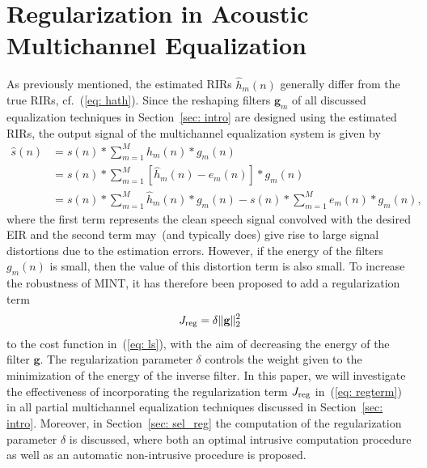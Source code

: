 \documentclass[draftcls,onecolumn,11pt]{IEEEtran}
\begin{document}
\section{Regularization in Acoustic Multichannel Equalization}
\label{sec: reg}
As previously mentioned, the estimated RIRs $\hat{h}_m(n)$ generally differ from the true RIRs, cf.~(\ref{eq: hath}).
Since the reshaping filters $\mathbf{g}_m$ of all discussed equalization techniques in Section~\ref{sec: intro} are designed using the estimated RIRs, the output signal of the multichannel equalization system is given by
\begin{align}
\hat{s}(n)  &= s(n) \ast \sum_{m=1}^M h_m(n) \ast g_m(n) \\
& = s(n) \ast \sum_{m=1}^M  \left[\hat{h}_m(n) - e_m(n)\right] \ast g_m(n) \\
\label{eq: 2}
& = s(n) \ast \sum_{m=1}^M \hat{h}_m(n) \ast g_m(n) - s(n) \ast \sum_{m=1}^M e_m(n) \ast g_m(n),
\end{align}
where the first term represents the clean speech signal convolved with the desired EIR and the second term may~(and typically does) give rise to large signal distortions due to the estimation errors.
However, if the energy of the filters $g_m(n)$ is small, then the value of this distortion term is also small.
To increase the robustness of MINT, it has therefore been proposed to add a regularization term
\begin{equation}
\label{eq: regterm}
J_{\rm reg} = \delta \|\mathbf{g}\|_2^2
\end{equation}
to the cost function in~(\ref{eq: ls}), with the aim of decreasing the energy of the filter $\mathbf{g}$.
The regularization parameter $\delta$ controls the weight given to the minimization of the energy of the inverse filter.
In this paper, we will investigate the effectiveness of incorporating the regularization term $J_{\rm reg}$ in~(\ref{eq: regterm}) in all partial multichannel equalization techniques discussed in Section~\ref{sec: intro}.
Moreover, in Section~\ref{sec: sel_reg} the computation of the regularization parameter $\delta$ is discussed, where both an optimal intrusive computation procedure as well as an automatic non-intrusive procedure is proposed.
\end{document}
